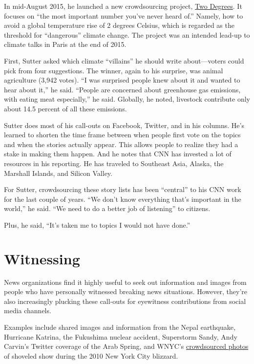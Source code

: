 \documentclass[notoc, symmetric, nobib, nols]{towcenter-guideto-book}
\begin{document}
In mid-August 2015, he launched a new crowdsourcing project, \href{http://www.cnn.com/specials/opinions/two-degrees}{Two Degrees}. It focuses on ``the most important number you've never heard of.'' Namely, how to avoid a global temperature rise of 2 degrees Celsius, which is regarded as the threshold for ``dangerous'' climate change.%
 The project was an intended lead-up to climate talks in Paris at the end of 2015. 

First, Sutter asked which climate ``villains'' he should write about---voters could pick from four suggestions. The winner, again to his surprise, was animal agriculture (3,942 votes). ``I was surprised people knew about it and wanted to hear about it,'' he said. ``People are concerned about greenhouse gas emissions, with eating meat especially,'' he said. Globally, he noted, livestock contribute only about 14.5 percent of all these emissions.

Sutter does most of his call-outs on Facebook, Twitter, and in his columns. He's learned to shorten the time frame between when people first vote on the topics and when the stories actually appear. This allows people to realize they had a stake in making them happen. And he notes that CNN has invested a lot of resources in his reporting. He has traveled to Southeast Asia, Alaska, the Marshall Islands, and Silicon Valley. 

For Sutter, crowdsourcing these story lists has been “central” to his CNN work for the last couple of years. ``We don't know everything that's important in the world,'' he said. ``We need to do a better job of listening'' to citizens.

Plus, he said, ``It's taken me to topics I would not have done.''

\section{ Witnessing}  

News organizations find it highly useful to seek out information and images from people who have personally witnessed breaking news situations. However, they're also increasingly plucking these call-outs for eyewitness contributions from social media channels.  

Examples include shared images and information from the Nepal earthquake, Hurricane Katrina, the Fukushima nuclear accident, Superstorm Sandy, Andy Carvin's Twitter coverage of the Arab Spring,\autocite{Carvin} and WNYC's \href{http://www.wnyc.org/story/105465-2-mapping-storm-clean/}{crowdsourced photos} of shoveled show during the 2010 New York City blizzard.\autocite{Storm}
\end{document}

